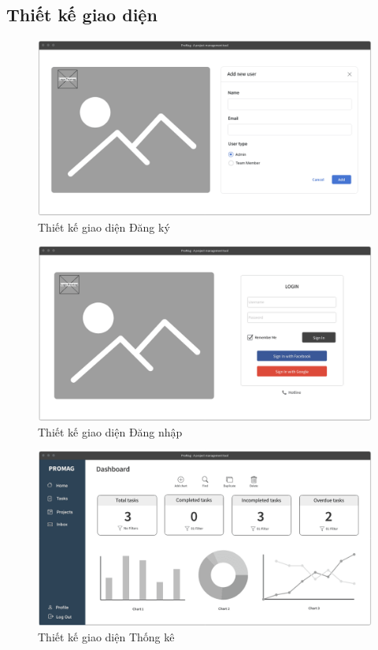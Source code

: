 \documentclass[../DoAn.tex]{subfiles}
\begin{document}
\subsection{Thiết kế giao diện}
\label{subsection:4.2.1}
\begin{figure}[H]
    \centering
    \includegraphics[width=1.0\linewidth]{Hinhve/Mockup_Register.png}
    \caption{Thiết kế giao diện Đăng ký}
    \label{fig:Mockup_Register}
\end{figure}

\begin{figure}[H]
    \centering
    \includegraphics[width=1.0\linewidth]{Hinhve/Mockup_Login.png}
    \caption{Thiết kế giao diện Đăng nhập}
    \label{fig:Mockup_Login}
\end{figure}

\newpage

\begin{figure}[H]
    \centering
    \includegraphics[width=1.0\linewidth]{Hinhve/Mockup_Dashboard.png}
    \caption{Thiết kế giao diện Thống kê}
    \label{fig:Mockup_Dashboard}
\end{figure}
\end{document}
